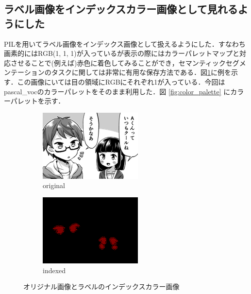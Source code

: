 \documentclass[onecolumn]{ujarticle}   %
\begin{document}
	\subsection{ラベル画像をインデックスカラー画像として見れるようにした}
	PILを用いてラベル画像をインデックス画像として扱えるようにした．すなわち画素的にはRGB(1, 1, 1)が入っているが表示の際にはカラーパレットマップと対応させることで(例えば)赤色に着色してみることができ，セマンティックセグメンテーションのタスクに関しては非常に有用な保存方法である．図\ref{fig:indexed}に例を示す．この画像にいては目の領域にRGBにそれぞれ1が入っている．今回はpascal\_vocのカラーパレットをそのまま利用した．図 \ref{fig:color_palette} にカラーパレットを示す．
	\begin{figure}[h]
		\centering
		\vspace{-7mm}
		\begin{subfigure}{0.45\columnwidth}
			\centering
			\includegraphics[width=1.3\columnwidth]{1_original.png}
			\caption{original}
		\end{subfigure}
		\begin{subfigure}{0.45\columnwidth}
			\centering
			\includegraphics[width=1.3\columnwidth]{1_indexed.png}
			\caption{indexed}
		\end{subfigure}
		\caption{オリジナル画像とラベルのインデックスカラー画像}
		\label{fig:indexed}
	\end{figure}
\end{document}
